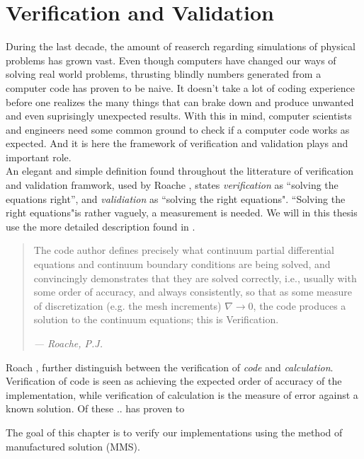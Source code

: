 \chapter{Verification and Validation}
During the last decade, the amount of reaserch regarding simulations of physical problems has grown vast. Even though computers have changed our ways of solving real world problems, thrusting blindly numbers generated from a computer code has proven to be naive. It doesn't take a lot of coding experience before one realizes the many things that can brake down and produce unwanted and even suprisingly unexpected results. 
With this in mind, computer scientists and engineers need some common ground to check if a computer code works as expected. And it is here the framework of verification and validation plays and important role. \\

 An elegant and simple definition found throughout the litterature of verification and validation framwork, used  by Roache \cite{Roache}, states \textit{verification} as ``solving the equations right'', and  \textit{validiation} as ``solving the right equations". ``Solving the right equations"is rather vaguely, a measurement is needed. We will in this thesis use the more detailed  description found in \cite{Roache}.

\begin{quote}
The code author defines precisely what continuum partial differential equations and continuum boundary conditions are being solved, and convincingly demonstrates that they are solved correctly, i.e., usually with some order of accuracy, and always consistently, so that as some measure of discretization (e.g. the mesh increments) $\nabla \rightarrow 0$, the code produces a solution to the continuum equations; this is Verification.
\begin{flushright}
\textit{--- Roache, P.J.}
\end{flushright}
\end{quote}
 

Roach \cite{Roache2002},  further distinguish between the verification of \textit{code} and \textit{calculation}. Verification of code is seen as achieving the expected order of accuracy of the implementation, while verification of calculation is the measure of error against a known solution. Of these .. has proven to 

The goal of this chapter is to verify our implementations using the method of manufactured solution  (MMS).

